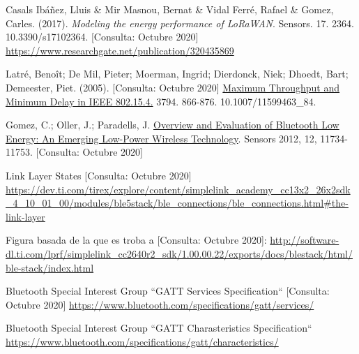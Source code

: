\begin{thebibliography}{2}
Casals Ibáñez, Lluis \& Mir Masnou, Bernat \& Vidal Ferré, Rafael \& Gomez, Carles. (2017). \textit{Modeling the energy performance of LoRaWAN}. Sensors. 17. 2364. 10.3390/s17102364. 
[Consulta: Octubre 2020] \newline
\href{https://www.researchgate.net/publication/320435869}{https://www.researchgate.net/publication/320435869}

Latré, Benoît; De Mil, Pieter; Moerman, Ingrid; Dierdonck, Niek; Dhoedt, Bart; Demeester, Piet. (2005).
[Consulta: Octubre 2020] \href{https://www.researchgate.net/publication/220963645_Maximum_Throughput_and_Minimum_Delay_in_IEEE_802154}{Maximum Throughput and Minimum Delay in IEEE 802.15.4.} 3794. 866-876. 10.1007/11599463\_84.

Gomez, C.; Oller, J.; Paradells, J.  \href{https://www.mdpi.com/1424-8220/12/9/11734}{Overview and Evaluation of Bluetooth Low Energy: An Emerging Low-Power Wireless Technology}. Sensors 2012, 12, 11734-11753.
[Consulta: Octubre 2020]

Link Layer States [Consulta: Octubre 2020]\newline
\href{https://dev.ti.com/tirex/explore/content/simplelink_academy_cc13x2_26x2sdk_4_10_01_00/modules/ble5stack/ble_connections/ble_connections.html\#the-link-layer}{https://dev.ti.com/tirex/explore/content/simplelink\_academy\_cc13x2\_26x2sdk\_4\_10\_01\_00/modules/ble5stack/ble\_connections/ble\_connections.html\#the-link-layer}

Figura basada de la que es troba a [Consulta: Octubre 2020]:\newline
\href{http://software-dl.ti.com/lprf/simplelink_cc2640r2_sdk/1.00.00.22/exports/docs/blestack/html/ble-stack/index.html}{http://software-dl.ti.com/lprf/simplelink\_cc2640r2\_sdk/1.00.00.22/exports/docs/blestack/html/ble-stack/index.html}

Bluetooth Special Interest Group
``GATT Services Specification``
[Consulta: Octubre 2020]\newline
\href{https://www.bluetooth.com/specifications/gatt/services/}{https://www.bluetooth.com/specifications/gatt/services/}

Bluetooth Special Interest Group ``GATT Charasteristics Specification``\newline
\href{https://www.bluetooth.com/specifications/gatt/characteristics/}{https://www.bluetooth.com/specifications/gatt/characteristics/}


\end{thebibliography}
